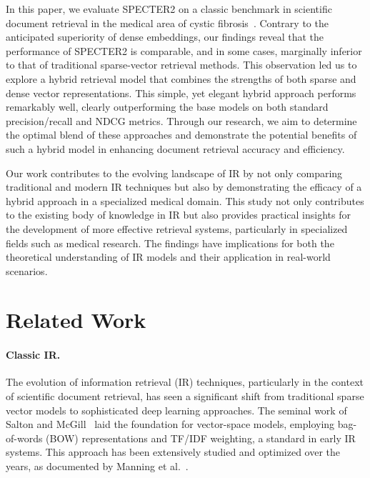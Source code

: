 \documentclass[
]{ceurart}
\begin{document}
In this paper, 
we evaluate SPECTER2 on a classic benchmark in scientific document retrieval in the medical area of cystic fibrosis~\cite{cf-data}.
Contrary to the anticipated superiority of dense embeddings, our findings reveal that the performance of SPECTER2 is comparable, and in some cases, marginally inferior to that of traditional sparse-vector retrieval methods. This observation led us to explore a hybrid retrieval model that combines the strengths of both sparse and dense vector representations. 
This simple, yet elegant hybrid approach performs remarkably well, clearly outperforming the base models on both standard precision/recall and NDCG metrics.   
Through our research, we aim to determine the optimal blend of these approaches and demonstrate the potential benefits of such a hybrid model in enhancing document retrieval accuracy and efficiency.

Our work contributes to the evolving landscape of IR by not only comparing traditional and modern IR techniques but also by demonstrating the efficacy of a hybrid approach in a specialized medical domain. 
This study not only contributes to the existing body of knowledge in IR but also provides practical insights for the development of more effective retrieval systems, particularly in specialized fields such as medical research. The findings have implications for both the theoretical understanding of IR models and their application in real-world scenarios.


\section{Related Work}

\paragraph{Classic IR.} The evolution of information retrieval (IR) techniques, particularly in the context of scientific document retrieval, has seen a significant shift from traditional sparse vector models to sophisticated deep learning approaches. The seminal work of Salton and McGill~\cite{salton1983introduction} laid the foundation for vector-space models, employing bag-of-words (BOW) representations and TF/IDF weighting, a standard in early IR systems. This approach has been extensively studied and optimized over the years, as documented by Manning et al.~\cite{manning:book08}.
\end{document}

